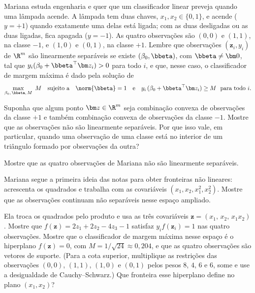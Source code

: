 Mariana estuda engenharia e quer que um classificador linear preveja quando uma lâmpada
acende. A lâmpada tem duas chaves, $x_1,x_2\in\{0,1\}$, e acende ($y=+1$) quando exatamente
uma delas está ligada; com as duas desligadas ou as duas ligadas, fica apagada ($y=-1$). As
quatro observações são $(0,0)$ e $(1,1)$, na classe $-1$, e $(1,0)$ e $(0,1)$, na classe
$+1$. Lembre que observações $(\bm z_i,y_i)$ de $\R^m$ são linearmente separáveis se existe
$(\beta_0,\bbeta)$, com $\bbeta\ne\bm0$, tal que $y_i(\beta_0+\bbeta^\top\bm z_i)>0$ para todo
$i$, e que, nesse caso, o classificador de margem máxima é dado pela solução de
\[
  \max_{\beta_0,\,\bbeta,\,M}\ M
  \quad\text{sujeito a}\quad
  \norm{\bbeta}=1
  \quad\text{e}\quad
  y_i\,(\beta_0+\bbeta^\top\bm z_i)\ge M\ \text{ para todo } i .
\]
\begin{itens}
  \item {} Suponha que algum ponto $\bm z\in\R^m$ seja combinação convexa de
        observações da classe $+1$ e também combinação convexa de observações da classe
        $-1$. Mostre que as observações não são linearmente separáveis. Por que isso vale,
        em particular, quando uma observação de uma classe está no interior de um triângulo
        formado por observações da outra?
  \item {} Mostre que as quatro observações de Mariana não são linearmente separáveis.
  \item {} Mariana segue a primeira ideia das notas para obter fronteiras não lineares:
        acrescenta os quadrados e trabalha com as covariáveis $(x_1,x_2,x_1^2,x_2^2)$. Mostre
        que as observações continuam não separáveis nesse espaço ampliado.
  \item {} Ela troca os quadrados pelo produto e usa as três covariáveis
        $\bm z=(x_1,\,x_2,\,x_1x_2)$. Mostre que $f(\bm z)=2z_1+2z_2-4z_3-1$ satisfaz
        $y_if(\bm z_i)=1$ nas quatro observações. Mostre que o classificador de margem
        máxima nesse espaço é o hiperplano $f(\bm z)=0$, com $M=1/\sqrt{24}\approx0{,}204$,
        e que as quatro observações são vetores de suporte. (Para a cota superior, multiplique
        as restrições das observações $(0,0)$, $(1,1)$, $(1,0)$ e $(0,1)$ pelos pesos $8$,
        $4$, $6$ e $6$, some e use a desigualdade de Cauchy--Schwarz.) Que fronteira esse
        hiperplano define no plano $(x_1,x_2)$?
\end{itens}

